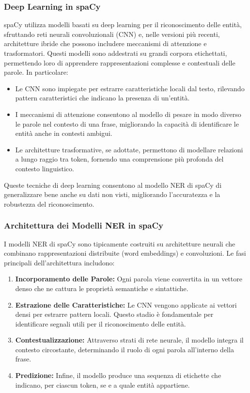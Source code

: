 \subsubsection{Deep Learning in spaCy}
spaCy utilizza modelli basati su deep learning per il riconoscimento delle entità, sfruttando reti neurali convoluzionali (CNN) e, nelle versioni più recenti, architetture ibride che possono includere meccanismi di attenzione e trasformatori. Questi modelli sono addestrati su grandi corpora etichettati, permettendo loro di apprendere rappresentazioni complesse e contestuali delle parole. In particolare:
\begin{itemize}
    \item Le CNN sono impiegate per estrarre caratteristiche locali dal testo, rilevando pattern caratteristici che indicano la presenza di un'entità.
    \item I meccanismi di attenzione consentono al modello di pesare in modo diverso le parole nel contesto di una frase, migliorando la capacità di identificare le entità anche in contesti ambigui.
    \item Le architetture trasformative, se adottate, permettono di modellare relazioni a lungo raggio tra token, fornendo una comprensione più profonda del contesto linguistico.
\end{itemize}

Queste tecniche di deep learning consentono al modello NER di spaCy di generalizzare bene anche su dati non visti, migliorando l'accuratezza e la robustezza del riconoscimento.

\subsubsection{Architettura dei Modelli NER in spaCy}
I modelli NER di spaCy sono tipicamente costruiti su architetture neurali che combinano rappresentazioni distribuite (word embeddings) e convoluzioni. Le fasi principali dell'architettura includono:
\begin{enumerate}
    \item \textbf{Incorporamento delle Parole:} Ogni parola viene convertita in un vettore denso che ne cattura le proprietà semantiche e sintattiche.
    \item \textbf{Estrazione delle Caratteristiche:} Le CNN vengono applicate ai vettori densi per estrarre pattern locali. Questo stadio è fondamentale per identificare segnali utili per il riconoscimento delle entità.
    \item \textbf{Contestualizzazione:} Attraverso strati di rete neurale, il modello integra il contesto circostante, determinando il ruolo di ogni parola all'interno della frase.
    \item \textbf{Predizione:} Infine, il modello produce una sequenza di etichette che indicano, per ciascun token, se e a quale entità appartiene.
\end{enumerate}

